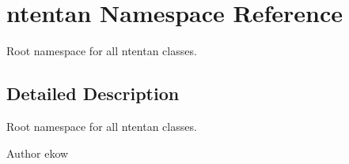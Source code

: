 \hypertarget{namespacententan}{
\section{ntentan Namespace Reference}
\label{namespacententan}
}


Root namespace for all ntentan classes.  




\subsection{Detailed Description}
Root namespace for all ntentan classes. \begin{DoxyAuthor}{Author}
ekow 
\end{DoxyAuthor}
